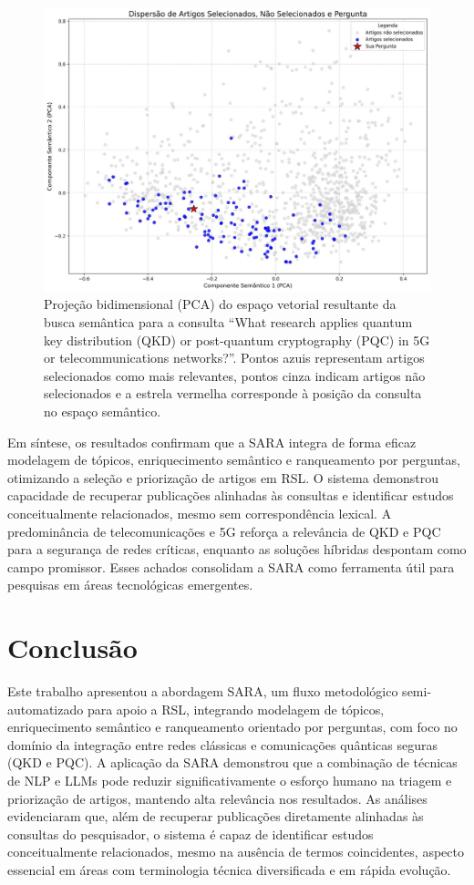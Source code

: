 \documentclass{siintec}
\begin{document}
\begin{figure}[ht]
    \centering
    \includegraphics[width=1\linewidth]{img/busca_semantica.jpeg}
    \caption{Projeção bidimensional (PCA) do espaço vetorial resultante da busca semântica  para a consulta “What research applies quantum key distribution (QKD) or post-quantum cryptography (PQC) in 5G or telecommunications networks?”. Pontos azuis representam artigos selecionados como mais relevantes, pontos cinza indicam artigos não selecionados e a estrela vermelha corresponde à posição da consulta no espaço semântico.}
    \label{fig:busca_semantica}
\end{figure}

Em síntese, os resultados confirmam que a SARA integra de forma eficaz modelagem de tópicos, enriquecimento semântico e ranqueamento por perguntas, otimizando a seleção e priorização de artigos em RSL. O sistema demonstrou capacidade de recuperar publicações alinhadas às consultas e identificar estudos conceitualmente relacionados, mesmo sem correspondência lexical. A predominância de telecomunicações e 5G reforça a relevância de QKD e PQC para a segurança de redes críticas, enquanto as soluções híbridas despontam como campo promissor. Esses achados consolidam a SARA como ferramenta útil para pesquisas em áreas tecnológicas emergentes.

\section{Conclusão}

Este trabalho apresentou a abordagem SARA, um fluxo metodológico semi-automatizado para apoio a RSL, integrando modelagem de tópicos, enriquecimento semântico e ranqueamento orientado por perguntas, com foco no domínio da integração entre redes clássicas e comunicações quânticas seguras (QKD e PQC). A aplicação da SARA demonstrou que a combinação de técnicas de NLP e LLMs pode reduzir significativamente o esforço humano na triagem e priorização de artigos, mantendo alta relevância nos resultados. As análises evidenciaram que, além de recuperar publicações diretamente alinhadas às consultas do pesquisador, o sistema é capaz de identificar estudos conceitualmente relacionados, mesmo na ausência de termos coincidentes, aspecto essencial em áreas com terminologia técnica diversificada e em rápida evolução.
\end{document}
